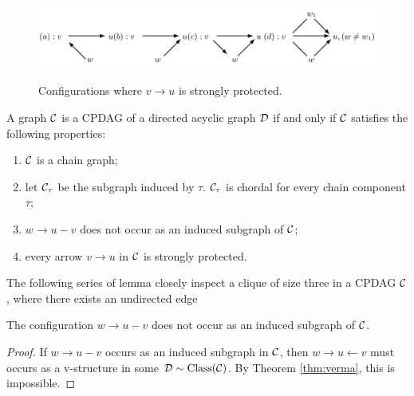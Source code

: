 \begin{figure}[h]
    \caption{Configurations where $v \rightarrow u$ is strongly protected.}
    \includegraphics[width=\textwidth]{strongly protected.png}
    \label{fig:stronglyprotected}
\end{figure}


\begin{theorem}
    A graph $\mathcal{C}$ is a CPDAG of a directed acyclic graph $\mathcal{D}$ if and only if $\mathcal{C}$ satisfies the following properties:
    \begin{enumerate}
        \item $\mathcal{C}$ is a chain graph;
        \item let $\mathcal{C}_\tau$ be the subgraph induced by $\tau$. $\mathcal{C}_\tau$ is chordal for every chain component $\tau$;
        \item $w \rightarrow u - v$ does not occur as an induced subgraph of $\mathcal{C}$;
        \item every arrow $v \rightarrow u$ in $\mathcal{C}$ is strongly protected.
    \end{enumerate}
\end{theorem}
\begin{remark}
    
\end{remark}

The following series of lemma closely inspect a clique of size three in a CPDAG $\mathcal{C}$, where there exists an undirected edge

\begin{lemma}\label{lem:0.4.1}
    The configuration $w \rightarrow u - v$ does not occur as an induced subgraph of $\mathcal{C}$.
\end{lemma}
\begin{proof}
    If $w \rightarrow u - v$ occurs as an induced subgraph in $\mathcal{C}$, then $w \rightarrow u \leftarrow v$ must occurs as a v-structure in some $\mathcal{D}\sim\text{Class}(\mathcal{C})$. By Theorem \ref{thm:verma}, this is impossible.
\end{proof}



